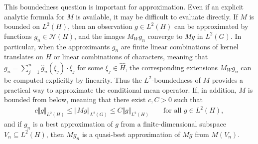 \documentclass{article}
\begin{document}
This boundedness question is important for approximation. Even if an explicit analytic formula for $M$ is available, it may be difficult to evaluate directly. If $M$ is bounded on $L^2(H)$, then an observation $g\in L^2(H)$ can be approximated by functions $g_n\in\mathcal N(H)$, and the images $M_Wg_n$ converge to $Mg$ in $L^2(G)$. In particular, when the approximants $g_n$ are finite linear combinations of kernel translates on $H$ or linear combinations of characters, meaning that $g_n=\sum_{j=1}^n \hat{g}_n(\xi_j) \cdot\xi_j$ for some $\xi_j \in \hat{H}$, the corresponding extensions $M_Wg_n$ can be computed explicitly by linearity. Thus the $L^2$-boundedness of $M$ provides a practical way to approximate the conditional mean operator. If, in addition, $M$ is bounded from below, meaning that there exist $c,C>0$ such that
\begin{align*}
c\Vert g\Vert_{L^2(H)}
\leq
\Vert Mg \Vert_{L^2(G)}
\leq
C\Vert g\Vert_{L^2(H)}
\qquad
\text{for all } g\in L^2(H),
\end{align*}
and if $g_n$ is a best approximation of $g$ from a finite-dimensional subspace $V_n\subseteq L^2(H)$, then $Mg_n$ is a quasi-best approximation of $Mg$ from $M(V_n)$.
\end{document}
